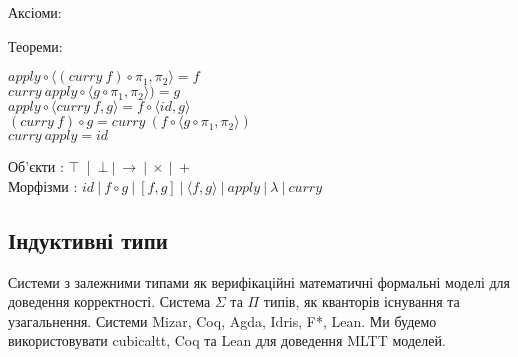 \begin{fullwidth}
\hspace{-2cm}
\begingroup
\parbox[t][][l]{0.40\textwidth}{

Аксіоми:

\begin{prooftree}
\end{prooftree}

\begin{prooftree}
\end{prooftree}

\begin{prooftree}
\end{prooftree}

}
\hspace{1cm}
\parbox[t][][r]{0.60\textwidth}{

Теореми:

\begin{center}
$apply \circ \langle (curry\ f) \circ \pi_1 , \pi_2 \rangle = f$\\
$curry\ apply \circ \langle g \circ \pi_1, \pi_2 \rangle) = g$\\
$apply \circ \langle curry\ f, g \rangle = f \circ \langle id , g\rangle$\\
$(curry\ f) \circ g = curry\ (f \circ \langle g \circ \pi_1,\pi_2\rangle)$\\
$curry\ apply = id$\\
\end{center}
}
\endgroup
\end{fullwidth}

\begin{center}
Об’єкти : $\top$\ |\ $\bot\ |\ \rightarrow\ |\ \times\ |\ +$\\
Морфізми : $id\ |\ f \circ g\ |\ [f,g]\ |\ \langle f, g \rangle\ |\ apply\ |\ \lambda\ |\ curry$
\end{center}

\newpage
\subsection{Індуктивні типи}
Системи з залежними типами як верифікаційні математичні формальні моделі
для доведення корректності. Система $\Sigma$ та $\Pi$ типів, як кванторів
існування та узагальнення. Системи Mizar, Coq, Agda, Idris, F*, Lean. Ми будемо
використовувати cubicaltt, Coq та Lean для доведення MLTT моделей.

